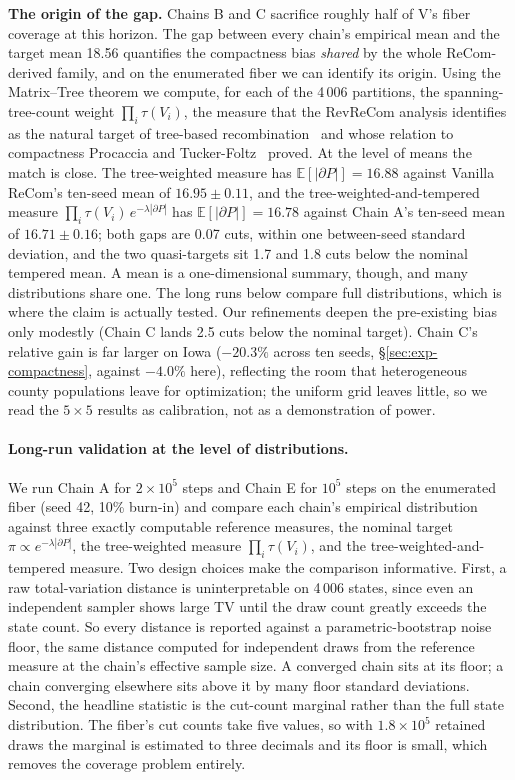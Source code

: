 \documentclass[11pt]{article}
\newcommand{\E}{\mathbb{E}}
\begin{document}
\textbf{The origin of the gap.} Chains B and C
sacrifice roughly half of V's fiber coverage at this horizon. The
gap between every chain's empirical mean and the target mean 18.56
quantifies the compactness bias \emph{shared} by the whole
ReCom-derived family, and on the enumerated fiber we can identify its
origin. Using the Matrix--Tree theorem we compute, for each of the
4\,006 partitions, the spanning-tree-count weight
$\prod_i \tau(V_i)$, the measure that the RevReCom analysis
identifies as the natural target of tree-based
recombination~\cite{cannon2022spanning,autry2023metropolized} and
whose relation to compactness Procaccia and
Tucker-Foltz~\cite{procaccia2022compact} proved. At the level of
means the match is close. The tree-weighted measure has
$\E[|\partial P|] = 16.88$ against Vanilla ReCom's ten-seed mean of
$16.95 \pm 0.11$, and the tree-weighted-and-tempered measure
$\prod_i \tau(V_i)\, e^{-\lambda|\partial P|}$ has
$\E[|\partial P|] = 16.78$ against Chain A's ten-seed mean of
$16.71 \pm 0.16$; both gaps are 0.07 cuts, within one between-seed
standard deviation, and the two quasi-targets sit 1.7 and 1.8 cuts
below the nominal tempered mean. A mean is a one-dimensional summary,
though, and many distributions share one. The long runs below compare
full distributions, which is where the claim is actually tested. Our
refinements deepen the pre-existing bias only modestly (Chain C lands
2.5 cuts below the nominal target). Chain C's relative gain is
far larger on Iowa ($-20.3\%$ across ten seeds,
\S\ref{sec:exp-compactness}, against $-4.0\%$ here), reflecting the
room that heterogeneous county populations leave for optimization;
the uniform grid leaves little, so we read the $5 \times 5$ results
as calibration, not as a demonstration of power.

\paragraph{Long-run validation at the level of distributions.}\label{sec:exp-longrun}
We run Chain A for $2 \times 10^5$ steps and Chain E for $10^5$ steps
on the enumerated fiber (seed 42, 10\% burn-in) and compare each
chain's empirical distribution against three exactly computable
reference measures, the nominal target
$\pi \propto e^{-\lambda|\partial P|}$, the tree-weighted measure
$\prod_i \tau(V_i)$, and the tree-weighted-and-tempered measure. Two
design choices make the comparison informative. First, a raw
total-variation distance is uninterpretable on 4\,006 states, since
even an independent sampler shows large TV until the draw count
greatly exceeds the state count. So every distance is reported
against a parametric-bootstrap noise floor, the same distance
computed for independent draws from the reference measure at the
chain's effective sample size. A converged chain sits at its floor; a
chain converging elsewhere sits above it by many floor standard
deviations. Second, the headline statistic is the cut-count marginal
rather than the full state distribution. The fiber's cut counts take
five values, so with $1.8 \times 10^5$ retained draws the marginal is
estimated to three decimals and its floor is small, which removes the
coverage problem entirely.
\end{document}
